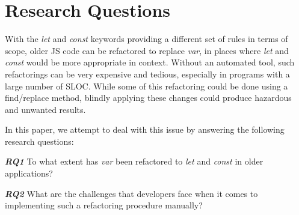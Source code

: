 \documentclass{sig-alternate}
\begin{document}
\date{25 April 2018}

\maketitle



%
%

%
%

%
%




\section{Research Questions}
With the \textit{let} and \textit{const} keywords providing a different set of rules in terms of scope, older JS code can be refactored to replace \textit{var}, in places where \textit{let} and \textit{const} would be more appropriate in context. 
Without an automated tool, such refactorings can be very expensive and tedious, especially in programs with a large number of SLOC. 
While some of this refactoring could be done using a find/replace method, blindly applying these changes could produce hazardous and unwanted results.

In this paper, we attempt to deal with this issue by answering the following research questions:

\textit{\textbf{RQ1}} To what extent has \textit{var} been refactored to \textit{let} and \textit{const} in older applications?

\textit{\textbf{RQ2}} What are the challenges that developers face when it comes to implementing such a refactoring procedure manually?
\end{document}

